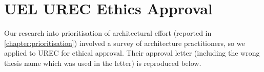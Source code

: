 \chapter {UEL UREC Ethics Approval}

Our research into prioritisation of architectural effort (reported in \cref{chapter:prioritisation}) involved a survey of architecture practitioners, so we applied to UREC for ethical approval.  Their approval letter (including the wrong thesis name which was used in the letter) is reproduced below.

